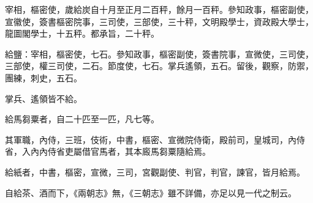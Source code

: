 \begin{pinyinscope}
 宰相，樞密使，歲給炭自十月至正月二百秤，餘月一百秤。參知政事，樞密副使，宣徽使，簽書樞密院事，三司使，三部使，三十秤，文明殿學士，資政殿大學士，龍圖閣學士，十五秤。都承旨，二十秤。



 給鹽：宰相，樞密使，七石。參知政事，樞密副使，簽書院事，宣微使，三司使，三部使，權三司使，二石。節度使，七石。掌兵遙領，五石。留後，觀察，防禦，團練，刺史，五石。



 掌兵、遙領皆不給。



 給馬芻粟者，自二十匹至一匹，凡七等。



 其軍職，內侍，三班，伎術，中書，樞密、宣微院侍衛，殿前司，皇城司，內侍省，入內內侍省吏屬借官馬者，其本廄馬芻粟隨給焉。



 給紙者，中書，樞密，宣微，三司，宮觀副使、判官，判官，諫官，皆月給焉。



 自給茶、酒而下，《兩朝志》無，《三朝志》雖不詳備，亦足以見一代之制云。



\end{pinyinscope}
